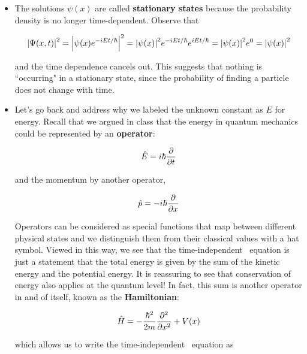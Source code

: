 \begin{itemize}
	\item The solutions $\psi(x)$ are called \textbf{stationary states} because the probability density is no longer time-dependent. 
	Observe that 
	
	\begin{equation*}
		\abs{\Psi(x,t)}^2 = \abs{\psi(x)e^{-iEt/\hbar}}^2 = \abs{\psi(x)}^2e^{-iEt/\hbar}e^{iEt/\hbar} = \abs{\psi(x)}^2e^0 = \abs{\psi(x)}^2
	\end{equation*}

	and the time dependence cancels out. 
	This suggests that nothing is ``occurring" in a stationary state, since the probability of finding a particle does not change with time.
	
	\item Let's go back and address why we labeled the unknown constant as $E$ for energy. 
	Recall that we argued in class that the energy in quantum mechanics could be represented by an \textbf{operator}: 
	
	\begin{equation}
		\hat{E} = i\hbar\pdv{t} \label{eq:Eop}
	\end{equation}
	
	and the momentum by another operator,
	
	\begin{equation}
		\hat{p} = -i\hbar\pdv{x} \label{eq:Pop}
	\end{equation}
	
	Operators can be considered as special functions that map between different physical states and we distinguish them from their classical values with a hat symbol. 
	Viewed in this way, we see that the time-independent \Sch\ equation is just a statement that the total energy is given by the sum of the kinetic energy and the potential energy. 
	It is reassuring to see that conservation of energy also applies at the quantum level! 
	In fact, this sum is another operator in and of itself, known as the \textbf{Hamiltonian}:
	
	\begin{tcolorbox}[title = Hamiltonian operator] \vspace{-2ex}
		\begin{equation}
		\hat{H} = -\frac{\hbar^2}{2m}\pdv[2]{x}+V(x) \label{eq:ham}
		\end{equation}
	\end{tcolorbox}

	which allows us to write the time-independent \Sch\ equation as
	

\end{itemize}
